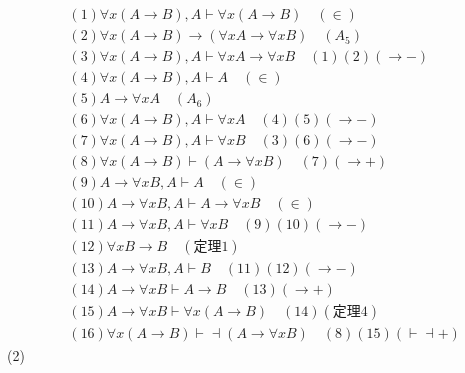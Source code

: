 \documentclass{article}
\begin{document}
\[
\begin{aligned}
&(1)\forall x (A \to B), A \vdash \forall x (A \to B) \quad (\in) \\
&(2)\forall x (A \to B) \to (\forall x A \to \forall x B) \quad (A_5) \\
&(3)\forall x (A \to B), A \vdash \forall x A \to \forall x B \quad (1)(2)(\to -) \\
&(4)\forall x (A \to B), A \vdash A \quad (\in) \\
&(5)A \to \forall x A \quad (A_6) \\
&(6)\forall x (A \to B), A \vdash \forall x A \quad (4)(5)(\to -) \\
&(7)\forall x (A \to B), A \vdash \forall x B \quad (3)(6)(\to -) \\
&(8)\forall x (A \to B) \vdash (A \to \forall x B) \quad (7)(\to +) \\
&(9)A \to \forall x B, A \vdash A \quad (\in) \\
&(10)A \to \forall x B, A \vdash A \to \forall x B \quad (\in) \\
&(11)A \to \forall x B, A \vdash \forall x B \quad (9)(10)(\to -) \\
&(12)\forall x B \to B \quad (\mbox{定理}1) \\
&(13)A \to \forall x B, A \vdash B \quad (11)(12)(\to -) \\
&(14)A \to \forall x B \vdash A \to B \quad (13)(\to +) \\
&(15)A \to \forall x B \vdash \forall x (A \to B) \quad (14)(\mbox{定理4}) \\
&(16)\forall x (A \to B) \vdash \dashv (A \to \forall x B) \quad (8)(15)(\vdash \dashv  +)
\end{aligned}    
\]
(2)
\end{document}
